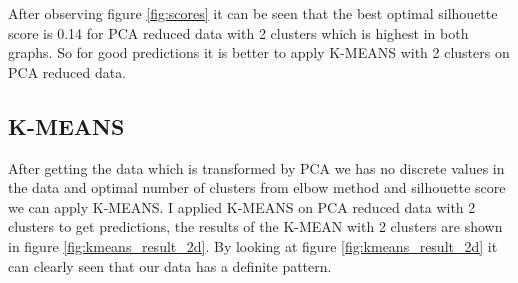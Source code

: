 \documentclass[12pt]{article}
\begin{document}
After observing figure \ref{fig:scores} it can be seen that the best optimal silhouette score is 0.14 for PCA reduced data with 2 clusters which is highest in both graphs. So for good predictions it is better to apply K-MEANS with 2 clusters on PCA reduced data.

\subsection{K-MEANS}
After getting the data which is transformed by PCA we has no discrete values in the data and optimal number of clusters from elbow method and silhouette score we can apply K-MEANS. I applied K-MEANS on PCA reduced data with 2 clusters to get predictions, the results of the K-MEAN with 2 clusters are shown in figure \ref{fig:kmeans_result_2d}. By looking at figure \ref{fig:kmeans_result_2d} it can clearly seen that our data has a definite pattern. 
\end{document}
